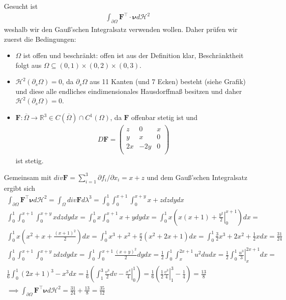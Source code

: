 \documentclass[]{article}
\begin{document}
Gesucht ist
\begin{align*}
	\int_{\partial \Omega} \bm{F}^\top \cdot \bm{\nu} d\mathcal{H}^2
\end{align*}
weshalb wir den Gauß'schen Integralsatz verwenden wollen. Daher prüfen wir zuerst die Bedingungen:
\begin{itemize}
	\item $\Omega$ ist offen und beschränkt: offen ist aus der Definition klar, Beschränktheit folgt aus $\Omega \subseteq (0,1)\times(0,2)\times(0,3)$.
	\item $\mathcal{H}^2(\partial_s\Omega) = 0$, da $\partial_s\Omega$ aus 11 Kanten (und 7 Ecken) besteht (siehe Grafik) und diese alle endliches eindimensionales Hausdorffmaß besitzen und daher $\mathcal{H}^2(\partial_s\Omega) = 0$.
	\item $\bm{F}:\overline{\Omega} \rightarrow \mathbb{R}^3 \in C(\overline{\Omega}) \cap C^1(\Omega)$, da $\bm{F}$ offenbar stetig ist und
	\begin{align*}
		D\bm{F} = \begin{pmatrix}
			z & 0 & x\\ y & x & 0\\ 2x & -2y & 0\\
		\end{pmatrix}
	\end{align*}
	ist stetig.
\end{itemize}

Gemeinsam mit $div\bm{F} = \sum_{i=1}^{3} \partial f_i / \partial x_i = x+z$ und dem Gauß'schen Integralsatz ergibt sich
\begin{align*}
	\int_{\partial\Omega} \bm{F}^\top \bm{\nu} d\mathcal{H}^2 = \int_\Omega div\bm{F} d\lambda^3 = \int_0^1 \int_0^{x+1} \int_0^{x+y} x+z dzdydx\\
	\int_0^1 \int_0^{x+1} \int_0^{x+y} x dzdydx = \int_0^1 x \int_0^{x+1} x+y dy dx = \int_0^1 x\left(x(x+1) + \left.\frac{y^2}{2}\right\vert_0^{x+1}\right) dx =\\
	\int_0^1 x \left(x^2+x + \frac{(x+1)^2}{2}\right) dx = \int_0^1 x^3 + x^2 + \frac{x}{2} (x^2+2x+1) dx = \int_0^1 \frac{3}{2} x^3 + 2 x^2 + \frac{1}{2} x dx = \frac{31}{24}\\
	\int_0^1 \int_0^{x+1} \int_0^{x+y} z dzdydx = \int_0^1 \int_0^{x+1} \frac{(x+y)^2}{2} dy dx = \frac{1}{2} \int_0^1 \int_x^{2x+1} u^2 du dx = \frac{1}{2} \int_0^1 \left.\frac{u^3}{3}\right\vert_x^{2x+1} dx =\\
	\frac{1}{6} \int_0^1 (2x+1)^3 - x^3 dx = \frac{1}{6} \left(\int_1^3 \frac{v^3}{2} dv - \left. \frac{x^4}{4}\right\vert_0^1\right) = \frac{1}{6} \left(\frac{1}{2} \left.\frac{v^3}{4}\right\vert_1^3 - \frac{1}{4}\right) = \frac{13}{8}\\
	\implies \int_{\partial\Omega} \bm{F}^\top \bm{\nu} d\mathcal{H}^2 = \frac{31}{24} + \frac{13}{8} = \frac{35}{12}
\end{align*}
\newpage
\end{document}
